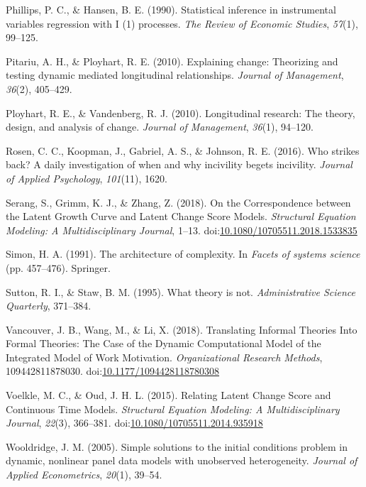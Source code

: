 \documentclass[english,,man]{apa6}
\begin{document}
\leavevmode\hypertarget{ref-phillips_statistical_1990}{}%
Phillips, P. C., \& Hansen, B. E. (1990). Statistical inference in instrumental variables regression with I (1) processes. \emph{The Review of Economic Studies}, \emph{57}(1), 99--125.

\leavevmode\hypertarget{ref-pitariu_explaining_2010}{}%
Pitariu, A. H., \& Ployhart, R. E. (2010). Explaining change: Theorizing and testing dynamic mediated longitudinal relationships. \emph{Journal of Management}, \emph{36}(2), 405--429.

\leavevmode\hypertarget{ref-ployhart_longitudinal_2010}{}%
Ployhart, R. E., \& Vandenberg, R. J. (2010). Longitudinal research: The theory, design, and analysis of change. \emph{Journal of Management}, \emph{36}(1), 94--120.

\leavevmode\hypertarget{ref-rosen_who_2016}{}%
Rosen, C. C., Koopman, J., Gabriel, A. S., \& Johnson, R. E. (2016). Who strikes back? A daily investigation of when and why incivility begets incivility. \emph{Journal of Applied Psychology}, \emph{101}(11), 1620.

\leavevmode\hypertarget{ref-serang_correspondence_2018}{}%
Serang, S., Grimm, K. J., \& Zhang, Z. (2018). On the Correspondence between the Latent Growth Curve and Latent Change Score Models. \emph{Structural Equation Modeling: A Multidisciplinary Journal}, 1--13. doi:\href{https://doi.org/10.1080/10705511.2018.1533835}{10.1080/10705511.2018.1533835}

\leavevmode\hypertarget{ref-simon1991architecture}{}%
Simon, H. A. (1991). The architecture of complexity. In \emph{Facets of systems science} (pp. 457--476). Springer.

\leavevmode\hypertarget{ref-sutton1995theory}{}%
Sutton, R. I., \& Staw, B. M. (1995). What theory is not. \emph{Administrative Science Quarterly}, 371--384.

\leavevmode\hypertarget{ref-vancouver_translating_2018}{}%
Vancouver, J. B., Wang, M., \& Li, X. (2018). Translating Informal Theories Into Formal Theories: The Case of the Dynamic Computational Model of the Integrated Model of Work Motivation. \emph{Organizational Research Methods}, 109442811878030. doi:\href{https://doi.org/10.1177/1094428118780308}{10.1177/1094428118780308}

\leavevmode\hypertarget{ref-voelkle_relating_2015}{}%
Voelkle, M. C., \& Oud, J. H. L. (2015). Relating Latent Change Score and Continuous Time Models. \emph{Structural Equation Modeling: A Multidisciplinary Journal}, \emph{22}(3), 366--381. doi:\href{https://doi.org/10.1080/10705511.2014.935918}{10.1080/10705511.2014.935918}

\leavevmode\hypertarget{ref-wooldridge2005simple}{}%
Wooldridge, J. M. (2005). Simple solutions to the initial conditions problem in dynamic, nonlinear panel data models with unobserved heterogeneity. \emph{Journal of Applied Econometrics}, \emph{20}(1), 39--54.
\end{document}
